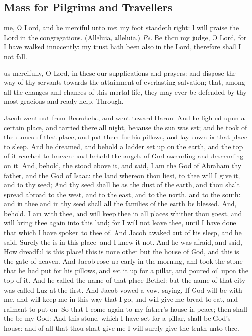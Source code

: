 \subsection{Mass for Pilgrims and Travellers}

\introit
{} me, O Lord, and be merciful unto me: my foot standeth right: I will praise the Lord in the congregations. (Alleluia, alleluia.) \textit{Ps.} Be thou my judge, O Lord, for I have walked innocently: my trust hath been also in the Lord, therefore shall I not fall.

\collect
{} us mercifully, O Lord, in these our supplications and prayers: and dispose the way of thy servants towards the attainment of everlasting salvation; that, among all the changes and chances of this mortal life, they may ever be defended by thy most gracious and ready help. Through.

 Jacob went out from Beersheba, and went toward Haran. And he lighted upon a certain place, and tarried there all night, because the sun was set; and he took of the stones of that place, and put them for his pillows, and lay down in that place to sleep. And he dreamed, and behold a ladder set up on the earth, and the top of it reached to heaven: and behold the angels of God ascending and descending on it. And, behold, the  stood above it, and said, I am the  God of Abraham thy father, and the God of Isaac: the land whereon thou liest, to thee will I give it, and to thy seed; And thy seed shall be as the dust of the earth, and thou shalt spread abroad to the west, and to the east, and to the north, and to the south: and in thee and in thy seed shall all the families of the earth be blessed. And, behold, I am with thee, and will keep thee in all places whither thou goest, and will bring thee again into this land; for I will not leave thee, until I have done that which I have spoken to thee of. And Jacob awaked out of his sleep, and he said, Surely the  is in this place; and I knew it not. And he was afraid, and said, How dreadful is this place! this is none other but the house of God, and this is the gate of heaven. And Jacob rose up early in the morning, and took the stone that he had put for his pillows, and set it up for a pillar, and poured oil upon the top of it. And he called the name of that place Bethel: but the name of that city was called Luz at the first. And Jacob vowed a vow, saying, If God will be with me, and will keep me in this way that I go, and will give me bread to eat, and raiment to put on, So that I come again to my father's house in peace; then shall the  be my God: And this stone, which I have set for a pillar, shall be God's house: and of all that thou shalt give me I will surely give the tenth unto thee.

